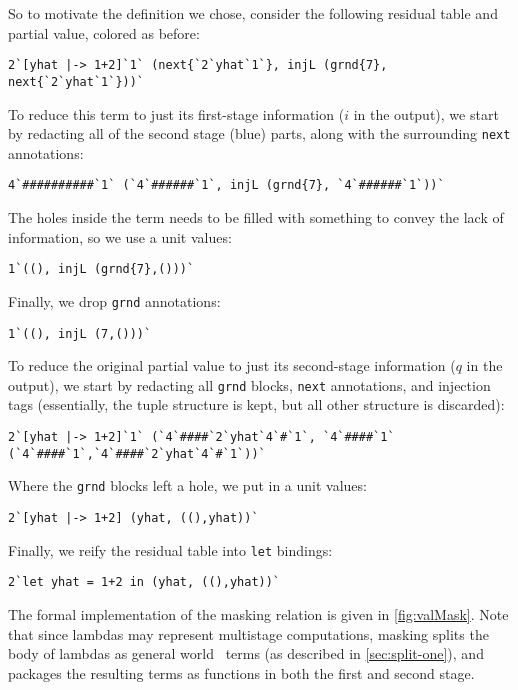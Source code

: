 \begin{abstrsyn}
So to motivate the definition we chose, consider the following residual table and partial value,
colored as before:
\begin{lstlisting}
2`[yhat |-> 1+2]`1` (next{`2`yhat`1`}, injL (grnd{7}, next{`2`yhat`1`}))`
\end{lstlisting}
To reduce this term to just its first-stage information ($i$ in the output), we start by redacting all of the second stage (blue) parts,
along with the surrounding \texttt{next} annotations:
\begin{lstlisting}
4`##########`1` (`4`######`1`, injL (grnd{7}, `4`######`1`))`
\end{lstlisting}
The holes inside the term needs to be filled with something to convey the lack of information, so we use a unit values:
\begin{lstlisting}
1`((), injL (grnd{7},()))`
\end{lstlisting}
Finally, we drop \texttt{grnd} annotations:
\begin{lstlisting}
1`((), injL (7,()))`
\end{lstlisting}
To reduce the original partial value to just its second-stage information ($q$ in the output), 
we start by redacting all \texttt{grnd} blocks, \texttt{next} annotations, and injection tags
(essentially, the tuple structure is kept, but all other structure is discarded):
\begin{lstlisting}
2`[yhat |-> 1+2]`1` (`4`####`2`yhat`4`#`1`, `4`####`1` (`4`####`1`,`4`####`2`yhat`4`#`1`))`
\end{lstlisting}
Where the \texttt{grnd} blocks left a hole, we put in a unit values:
\begin{lstlisting}
2`[yhat |-> 1+2] (yhat, ((),yhat))`
\end{lstlisting}
Finally, we reify the residual table into \texttt{let} bindings:
\begin{lstlisting}
2`let yhat = 1+2 in (yhat, ((),yhat))`
\end{lstlisting}

The formal implementation of the masking relation is given in \ref{fig:valMask}.
Note that since lambdas may represent multistage computations, 
masking splits the body of lambdas as general world \bbonem\ terms (as described in \ref{sec:split-one}), 
and packages the resulting terms as functions in both the first and second stage.


\end{abstrsyn}
